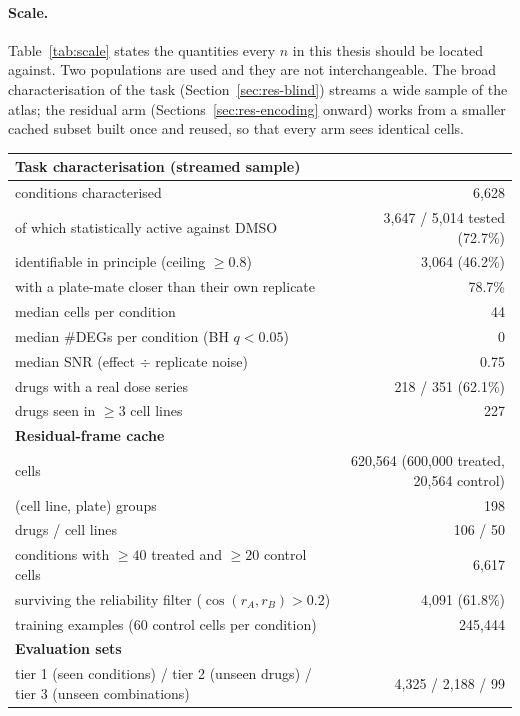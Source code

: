 \paragraph{Scale.} Table~\ref{tab:scale} states the quantities every $n$ in this thesis should be
located against. Two populations are used and they are not interchangeable. The broad
characterisation of the task (Section~\ref{sec:res-blind}) streams a wide sample of the atlas; the
residual arm (Sections~\ref{sec:res-encoding} onward) works from a smaller cached subset built once
and reused, so that every arm sees identical cells.

\begin{table}[h]
\centering
\begin{tabular}{lr}
\toprule
\multicolumn{2}{l}{\textbf{Task characterisation} (streamed sample)} \\
\midrule
conditions characterised & 6,628 \\
\quad of which statistically active against DMSO & 3,647 / 5,014 tested (72.7\%) \\
\quad identifiable in principle (ceiling $\geq 0.8$) & 3,064 (46.2\%) \\
\quad with a plate-mate closer than their own replicate & 78.7\% \\
median cells per condition & 44 \\
median \#DEGs per condition (BH $q<0.05$) & 0 \\
median SNR (effect $\div$ replicate noise) & 0.75 \\
drugs with a real dose series & 218 / 351 (62.1\%) \\
drugs seen in $\geq 3$ cell lines & 227 \\
\midrule
\multicolumn{2}{l}{\textbf{Residual-frame cache}} \\
\midrule
cells & 620,564 (600,000 treated, 20,564 control) \\
(cell line, plate) groups & 198 \\
drugs / cell lines & 106 / 50 \\
conditions with $\geq40$ treated and $\geq20$ control cells & 6,617 \\
\quad surviving the reliability filter ($\cos(r_A,r_B) > 0.2$) & 4,091 (61.8\%) \\
training examples (60 control cells per condition) & 245,444 \\
\midrule
\multicolumn{2}{l}{\textbf{Evaluation sets}} \\
\midrule
tier 1 (seen conditions) / tier 2 (unseen drugs) / tier 3 (unseen combinations) & 4,325 / 2,188 / 99 \\

\end{tabular}
\end{table}
